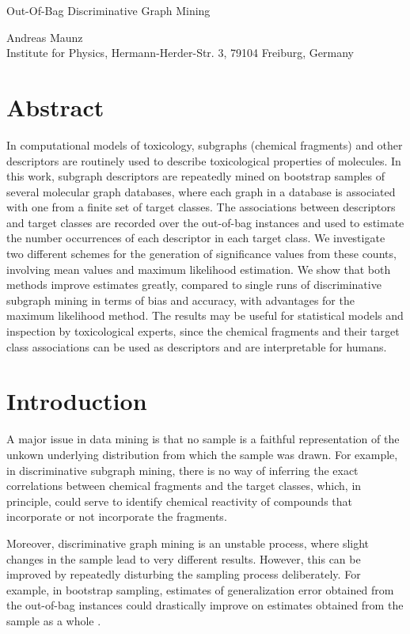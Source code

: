 \documentclass{article}
\begin{document}

\begin{center}
\begin{huge}Out-Of-Bag Discriminative Graph Mining\end{huge}

Andreas Maunz \\Institute for Physics, Hermann-Herder-Str. 3, 79104 Freiburg, Germany
\end{center}

\section{Abstract}
In computational models of toxicology, subgraphs (chemical fragments) and other
descriptors are routinely used to describe toxicological properties of
molecules.  In this work, subgraph descriptors are repeatedly mined on
bootstrap samples of several molecular graph databases, where each graph in a
database is associated with one from a finite set of target classes.  The
associations between descriptors and target classes are recorded over the
out-of-bag instances and used to estimate the number occurrences of each
descriptor in each target class.  We investigate two different schemes for the
generation of significance values from these counts, involving mean values and
maximum likelihood estimation.  We show that both methods improve estimates
greatly, compared to single runs of discriminative subgraph mining in terms of
bias and accuracy, with advantages for the maximum likelihood method.  The
results may be useful for statistical models and inspection by toxicological experts,
since the chemical fragments and their target class associations can be used as
descriptors and are interpretable for humans.

\section{Introduction}
A major issue in data mining is that no sample is a faithful representation of
the unkown underlying distribution from which the sample was drawn.  For
example, in discriminative subgraph mining, there is no way of inferring the
exact correlations between chemical fragments and the target classes, which, in
principle, could serve to identify chemical reactivity of compounds that
incorporate or not incorporate the fragments.

Moreover, discriminative graph mining is an unstable process, where slight
changes in the sample lead to very different results.  However, this can be
improved by repeatedly disturbing the sampling process deliberately. For
example, in bootstrap sampling, estimates of generalization error obtained from
the out-of-bag instances could drastically improve on estimates obtained from
the sample as a whole \cite{bylander02estimating, breiman96oob}.
\end{document}
